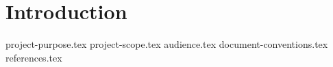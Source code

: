 \chapter{Introduction} \label{chap:introduction}

{project-purpose.tex}
\newpage
{project-scope.tex}
\newpage
{audience.tex}
\newpage
{document-conventions.tex}
\newpage
{references.tex}
\newpage
